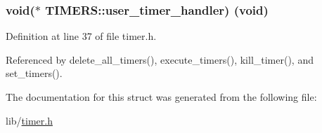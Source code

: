 \subsubsection[{\texorpdfstring{user\+\_\+timer\+\_\+handler}{user_timer_handler}}]{\setlength{\rightskip}{0pt plus 5cm}void($\ast$ T\+I\+M\+E\+R\+S\+::user\+\_\+timer\+\_\+handler) (void)}\hypertarget{structTIMERS_a4326e05ca52d80147efafd0d246ecb41}{}\label{structTIMERS_a4326e05ca52d80147efafd0d246ecb41}


Definition at line 37 of file timer.\+h.



Referenced by delete\+\_\+all\+\_\+timers(), execute\+\_\+timers(), kill\+\_\+timer(), and set\+\_\+timers().



The documentation for this struct was generated from the following file\+:\begin{DoxyCompactItemize}
\item 
lib/\hyperlink{timer_8h}{timer.\+h}\end{DoxyCompactItemize}
